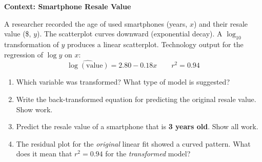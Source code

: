\documentclass[10pt]{article}
\begin{document}
\begin{tcolorbox}[colback=white, colframe=black!40, boxrule=0.8pt, arc=2mm,
    left=4mm, right=4mm, top=3mm, bottom=3mm,
    title={\textbf{Tier R --- Remediate}}, fonttitle=\bfseries, halign title=center]
\small

\textbf{Context: Smartphone Resale Value}

A researcher recorded the age of used smartphones (years, $x$) and their resale value
(\$, $y$). The scatterplot curves downward (exponential decay). A $\log_{10}$ transformation
of $y$ produces a linear scatterplot. Technology output for the regression of $\log y$ on $x$:
\[
  \widehat{\log(\text{value})} = 2.80 - 0.18x \qquad r^2 = 0.94
\]

\vspace{8pt}

\begin{enumerate}[leftmargin=1.6em, itemsep=0.18in]

  \item Which variable was transformed?  \quad
        What type of model is suggested? 

  \item Write the back-transformed equation for predicting the original resale value.
        Show work.\\[8pt]

  \item Predict the resale value of a smartphone that is \textbf{3 years old}. Show all work.\\[8pt]

  \item The residual plot for the \textit{original} linear fit showed a curved pattern.
        What does it mean that $r^2 = 0.94$ for the \textit{transformed} model?\\[8pt]

\end{enumerate}
\end{tcolorbox}
\end{document}
